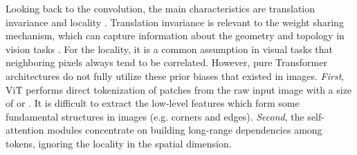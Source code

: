 \documentclass[10pt,twocolumn,letterpaper]{article}
\begin{document}
Looking back to the convolution, the main characteristics are translation invariance and locality \cite{DBLP:conf/nips/KrizhevskySH12,DBLP:journals/corr/SimonyanZ14a}. Translation invariance is relevant to the weight sharing mechanism, which can capture information about the geometry and topology in vision tasks \cite{DBLP:journals/neco/LeCunBDHHHJ89}. For the locality, it is a common assumption in visual tasks \cite{DBLP:conf/eccv/HeST10,DBLP:journals/spl/MihcakKRM99,DBLP:journals/tip/CriminisiPT04} that neighboring pixels always tend to be correlated. However, pure Transformer architectures do not fully utilize these prior biases that existed in images. \textit{First}, ViT performs direct tokenization of patches from the raw input image with a size of  or . It is difficult to extract the low-level features which form some fundamental structures in images (e.g. corners and edges). \textit{Second}, the self-attention modules concentrate on building long-range dependencies among tokens, ignoring the locality in the spatial dimension.
\end{document}
